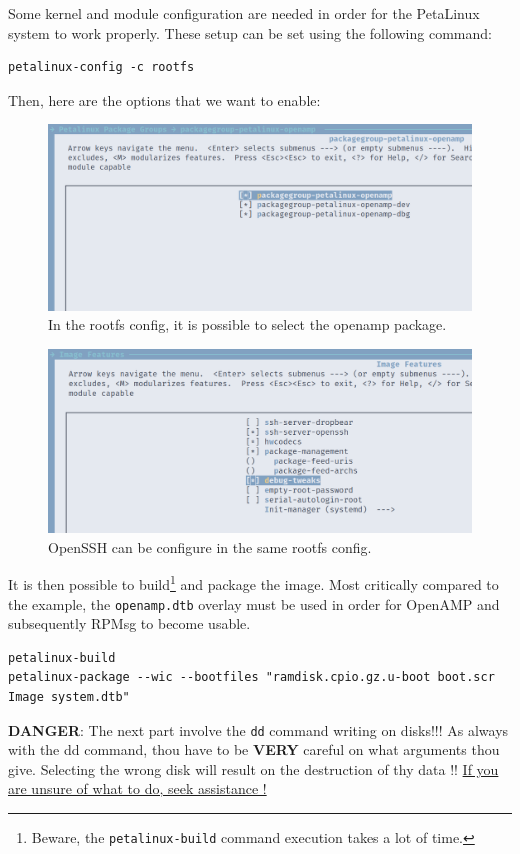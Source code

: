 \documentclass[10pt]{article}
\begin{document}
Some kernel and module configuration are needed in order for the PetaLinux system to work properly.
These setup can be set using the following command:
\begin{verbatim}
petalinux-config -c rootfs
\end{verbatim}

Then, here are the options that we want to enable:
\begin{figure}[htbp]
\centering
\includegraphics[width=.6\textwidth]{./img/yocto_openamp.png}
\caption{\label{fig:org3541b2d}In the rootfs config, it is possible to select the openamp package.}
\end{figure}


\begin{figure}[htbp]
\centering
\includegraphics[width=.6\textwidth]{./img/yocto_ssh.png}
\caption{\label{fig:org1184324}OpenSSH can be configure in the same rootfs config.}
\end{figure}

It is then possible to build\footnote{Beware, the \texttt{petalinux-build} command execution takes a lot of time.} and package the image. Most critically compared to the example,
the \texttt{openamp.dtb} overlay must be used in order for OpenAMP and subsequently RPMsg to become usable.
\begin{verbatim}
petalinux-build
petalinux-package --wic --bootfiles "ramdisk.cpio.gz.u-boot boot.scr Image system.dtb"
\end{verbatim}

\begin{tcolorbox}[colback=red!5!white,colframe=red!75!black]
\textbf{DANGER}: The next part involve the \texttt{dd} command writing on disks!!!
As always with the dd command, thou have to be \textbf{VERY} careful on what arguments
thou give. Selecting the wrong disk will result on the destruction of
thy data !!
\uline{If you are unsure of what to do, seek assistance !}
\end{tcolorbox}
\end{document}
